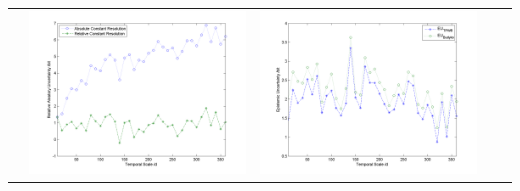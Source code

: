\documentclass[11pt]{article}
\begin{document}
\begin{table}[H]
{\begin{tabular}{c  c   c   c  c }
&\begin{minipage}{.4\textwidth}\includegraphics[width=\linewidth]{resultgraph/05484500AU.png}\end{minipage}
&\begin{minipage}{.4\textwidth}\includegraphics[width=\linewidth]{resultgraph/05484500EU.png}\end{minipage}
\\

\end{tabular}}
\end{table}
\end{document}
